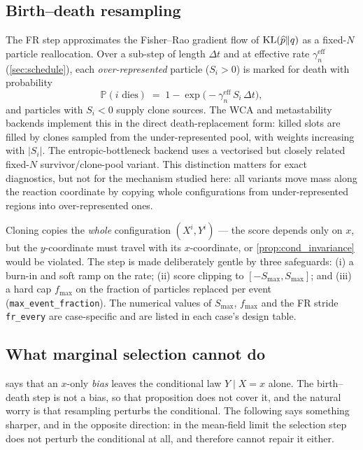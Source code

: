 \subsection{Birth--death resampling}
The FR step approximates the Fisher--Rao gradient flow of
$\mathrm{KL}(\widehat{p}\Vert q)$ as a fixed-$N$ particle reallocation. Over a sub-step
of length $\Delta t$ and at effective rate $\gamma_n^{\mathrm{eff}}$
(\cref{sec:schedule}), each \emph{over-represented} particle ($S_i>0$) is marked
for death with probability
\begin{equation}
  \mathbb P(\text{$i$ dies}) \;=\; 1-\exp\!\bigl(-\gamma_n^{\mathrm{eff}}\,S_i\,\Delta t\bigr),
  \label{eq:death}
\end{equation}
and particles with $S_i<0$ supply clone sources. The WCA and metastability
backends implement this in the direct death-replacement form: killed slots are
filled by clones sampled from the under-represented pool, with weights increasing
with $|S_i|$. The entropic-bottleneck backend uses a vectorised but closely
related fixed-$N$ survivor/clone-pool variant. This distinction matters for exact
diagnostics, but not for the mechanism studied here: all variants move mass along
the reaction coordinate by copying whole configurations from under-represented
regions into over-represented ones.

Cloning copies the \emph{whole} configuration $(X^i,Y^i)$ --- the score depends
only on $x$, but the $y$-coordinate must travel with its $x$-coordinate, or
\cref{prop:cond_invariance} would be violated. The step is made deliberately
gentle by three safeguards: (i) a burn-in and soft ramp on the rate; (ii) score
clipping to $[-S_{\max},S_{\max}]$; and (iii) a hard cap $f_{\max}$ on the
fraction of particles replaced per event (\texttt{max\_event\_fraction}). The
numerical values of $S_{\max}$, $f_{\max}$ and the FR stride
\texttt{fr\_every} are case-specific and are listed in each case's design table.

\subsection{What marginal selection cannot do}
\label{sec:selection_invariance}
 says that an $x$-only \emph{bias} leaves the conditional law
$Y\mid X=x$ alone. The birth--death step is not a bias, so that proposition does not cover it,
and the natural worry is that resampling perturbs the conditional. The following says
something sharper, and in the opposite direction: in the mean-field limit the selection step
does not perturb the conditional at all, and therefore cannot repair it either.

